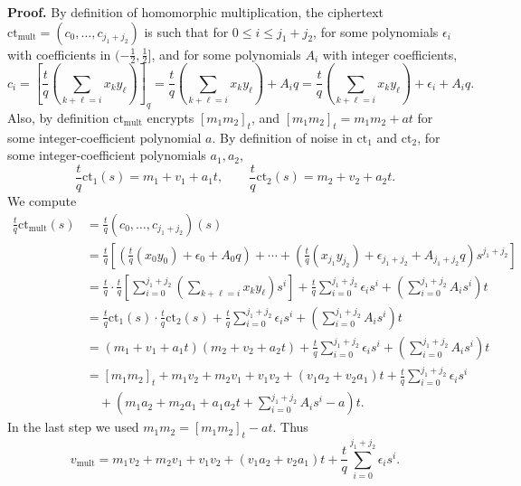 \documentclass[11pt]{article}
\newcommand{\ct}{\mathrm{ct}}
\newcommand{\ctmult}{\mathrm{ct}_{\mathrm{mult}}}
\newcommand{\vmult}{v_{\mathrm{mult}}}
\begin{document}
\textbf{Proof.}
By definition of homomorphic multiplication, the ciphertext
$\ctmult=(c_0,\ldots,c_{j_1+j_2})$ is such that for
$0\leq i\leq j_1+j_2$, for some polynomials $\epsilon_i$ with
coefficients in $(-\frac12,\frac12]$, and for some polynomials
$A_i$ with integer coefficients,
\[
 c_i=
 \left[\frac{t}{q}\left(\sum_{k+\ell=i}x_ky_\ell\right)\right]_q
 =\frac{t}{q}\left(\sum_{k+\ell=i}x_ky_\ell\right)+A_iq
 =\frac{t}{q}\left(\sum_{k+\ell=i}x_ky_\ell\right)+\epsilon_i+A_iq.
\]
Also, by definition $\ctmult$ encrypts $[m_1m_2]_t$, and
$[m_1m_2]_t=m_1m_2+at$ for some integer-coefficient polynomial $a$.
By definition of noise in $\ct_1$ and $\ct_2$, for some
integer-coefficient polynomials $a_1,a_2$,
\[
  \frac{t}{q}\ct_1(s)=m_1+v_1+a_1t,\qquad
  \frac{t}{q}\ct_2(s)=m_2+v_2+a_2t.
\]
We compute
\begin{align*}
\frac{t}{q}\ctmult(s)
&=\frac{t}{q}(c_0,\ldots,c_{j_1+j_2})(s)\\
&=\frac{t}{q}\left[
 \left(\frac{t}{q}(x_0y_0)+\epsilon_0+A_0q\right)
 +\cdots+
 \left(\frac{t}{q}(x_{j_1}y_{j_2})+\epsilon_{j_1+j_2}
       +A_{j_1+j_2}q\right)s^{j_1+j_2}
 \right]\\
&=\frac{t}{q}\cdot\frac{t}{q}
 \left[\sum_{i=0}^{j_1+j_2}
       \left(\sum_{k+\ell=i}x_ky_\ell\right)s^i\right]
 +\frac{t}{q}\sum_{i=0}^{j_1+j_2}\epsilon_i s^i
 +\left(\sum_{i=0}^{j_1+j_2}A_is^i\right)t\\
&=\frac{t}{q}\ct_1(s)\cdot\frac{t}{q}\ct_2(s)
 +\frac{t}{q}\sum_{i=0}^{j_1+j_2}\epsilon_i s^i
 +\left(\sum_{i=0}^{j_1+j_2}A_is^i\right)t\\
&=(m_1+v_1+a_1t)(m_2+v_2+a_2t)
 +\frac{t}{q}\sum_{i=0}^{j_1+j_2}\epsilon_i s^i
 +\left(\sum_{i=0}^{j_1+j_2}A_is^i\right)t\\
&=[m_1m_2]_t+m_1v_2+m_2v_1+v_1v_2
 +(v_1a_2+v_2a_1)t
 +\frac{t}{q}\sum_{i=0}^{j_1+j_2}\epsilon_i s^i\\
&\quad+\left(m_1a_2+m_2a_1+a_1a_2t
             +\sum_{i=0}^{j_1+j_2}A_is^i-a\right)t.
\end{align*}
In the last step we used $m_1m_2=[m_1m_2]_t-at$. Thus
\[
  \vmult=m_1v_2+m_2v_1+v_1v_2
       +(v_1a_2+v_2a_1)t
       +\frac{t}{q}\sum_{i=0}^{j_1+j_2}\epsilon_i s^i.
\]
\end{document}
